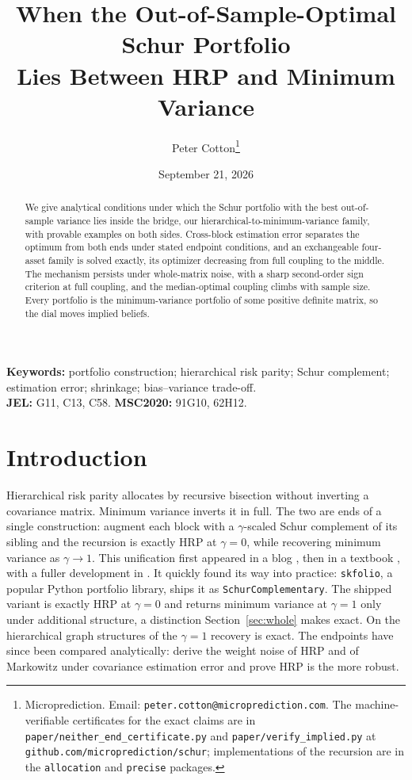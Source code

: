 \documentclass[11pt]{article}
\title{When the Out-of-Sample-Optimal Schur Portfolio\\
Lies Between HRP and Minimum Variance}
\author{Peter Cotton\thanks{Microprediction.
Email: \texttt{peter.cotton@microprediction.com}. The machine-verifiable
certificates for the exact claims are in
\texttt{paper/neither\_end\_certificate.py} and
\texttt{paper/verify\_implied.py} at
\texttt{github.com/microprediction/schur}; implementations of the recursion
are in the \texttt{allocation} and \texttt{precise} packages.}}
\date{September 21, 2026}
\theoremstyle{remark}
\begin{document}
\maketitle

\begin{abstract}
We give analytical conditions under which the Schur portfolio with the
best out-of-sample variance lies inside the bridge, our
hierarchical-to-minimum-variance family, with provable examples on both
sides. Cross-block estimation error separates the optimum from both ends
under stated endpoint conditions, and an exchangeable four-asset family
is solved exactly, its optimizer decreasing from full coupling to the
middle. The mechanism persists under whole-matrix noise, with a sharp
second-order sign criterion at full coupling, and the median-optimal
coupling climbs with sample size. Every portfolio is the minimum-variance
portfolio of some positive definite matrix, so the dial moves implied
beliefs.
\end{abstract}

\noindent\textbf{Keywords:} portfolio construction; hierarchical risk parity;
Schur complement; estimation error; shrinkage; bias--variance trade-off.\\
\textbf{JEL:} G11, C13, C58. \quad \textbf{MSC2020:} 91G10, 62H12.

\section{Introduction}
\label{sec:intro}

Hierarchical risk parity \cite{lopezdeprado2016} allocates by recursive
bisection without inverting a covariance matrix. Minimum variance inverts it
in full. The two are ends of a single construction: augment each block with
a $\gamma$-scaled Schur complement of its sibling and the recursion is
exactly HRP at $\gamma = 0$, while recovering minimum variance as
$\gamma \to 1$. This unification first appeared in a blog
\cite{cotton2022blog}, then in a textbook \cite[\S12.3.4]{palomar2025}, with
a fuller development in \cite{cotton2024schur}. It quickly found its way
into practice: \texttt{skfolio}, a popular Python portfolio library, ships
it as \texttt{SchurComplementary}. The shipped variant is exactly HRP at
$\gamma = 0$ and returns minimum variance at $\gamma = 1$ only under
additional structure, a distinction Section~\ref{sec:whole} makes exact.
On the hierarchical graph structures of
\cite{mograby2025} the $\gamma = 1$ recovery is exact. The endpoints have
since been compared analytically: \cite{antonov2025} derive the weight noise
of HRP and of Markowitz under covariance estimation error and prove HRP is
the more robust.
\end{document}
